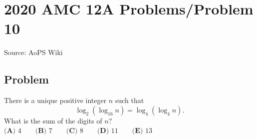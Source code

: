 \documentclass[12pt]{article}
\begin{document}
\section*{{2020 AMC 12A Problems/Problem 10}}
Source: AoPS Wiki

\subsection*{Problem}
There is a unique positive integer $n$ such that \[\log_2{(\log_{16}{n})} = \log_4{(\log_4{n})}.\] What is the sum of the digits of $n?$ $\textbf{(A) } 4 \qquad \textbf{(B) } 7 \qquad \textbf{(C) } 8 \qquad \textbf{(D) } 11 \qquad \textbf{(E) } 13$
\end{document}
